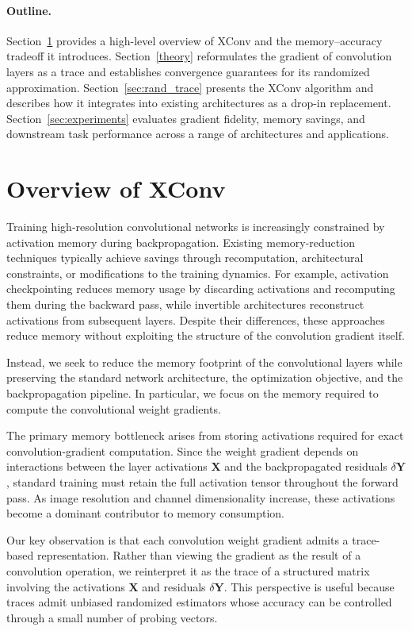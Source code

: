 \documentclass[10pt]{article}
\newcommand{\B}{\mathbf}
\begin{document}
\paragraph{Outline.} Section~\ref{sec:xconv_intuition} provides a high-level overview of XConv and the memory--accuracy tradeoff it introduces. Section~\ref{theory} reformulates the gradient of convolution layers as a trace and establishes convergence guarantees for its randomized approximation. Section~\ref{sec:rand_trace} presents the XConv algorithm and describes how it integrates into existing architectures as a drop-in replacement. Section~\ref{sec:experiments} evaluates gradient fidelity, memory savings, and downstream task performance across a range of architectures and applications.

\section{Overview of XConv}
\label{sec:xconv_intuition}

Training high-resolution convolutional networks is increasingly constrained by activation memory during backpropagation. Existing memory-reduction techniques typically achieve savings through recomputation, architectural constraints, or modifications to the training dynamics. For example, activation checkpointing reduces memory usage by discarding activations and recomputing them during the backward pass, while invertible architectures reconstruct activations from subsequent layers. Despite their differences, these approaches reduce memory without exploiting the structure of the convolution gradient itself.

Instead, we seek to reduce the memory footprint of the convolutional layers while preserving the standard network architecture, the optimization objective, and the backpropagation pipeline. In particular, we focus on the memory required to compute the convolutional weight gradients.

The primary memory bottleneck arises from storing activations required for exact convolution-gradient computation. Since the weight gradient depends on interactions between the layer activations $\B{X}$ and the backpropagated residuals $\delta \B{Y}$, standard training must retain the full activation tensor throughout the forward pass. As image resolution and channel dimensionality increase, these activations become a dominant contributor to memory consumption.

Our key observation is that each convolution weight gradient admits a trace-based representation. Rather than viewing the gradient as the result of a convolution operation, we reinterpret it as the trace of a structured matrix involving the activations $\B{X}$ and residuals $\delta \B{Y}$. This perspective is useful because traces admit unbiased randomized estimators whose accuracy can be controlled through a small number of probing vectors.
\end{document}
